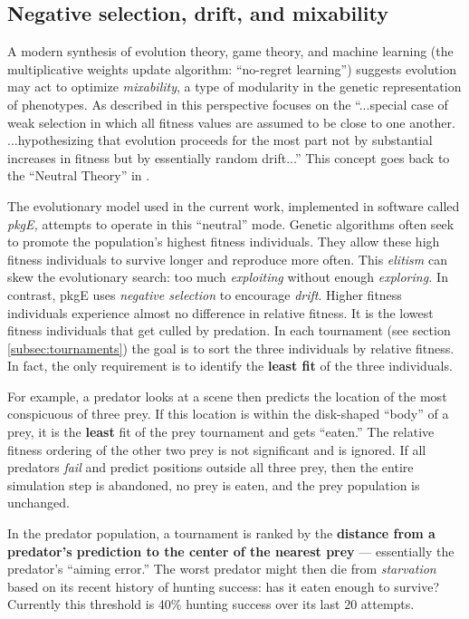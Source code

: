 \documentclass[acmtog]{acmart}
\newcommand{\jargon}[1]{\textit{#1}}
\newcommand{\lazypredator}[0]{pkgE}
\begin{document}
\subsection{Negative selection, drift, and mixability}

A modern synthesis \cite{livnat_sex_2016} of evolution theory, game theory, and machine learning (the multiplicative weights update algorithm: “no-regret learning”) suggests evolution may act to optimize \jargon{mixability}, a type of modularity in the genetic representation of phenotypes. As described in \citet{chastain_multiplicative_2013} this perspective focuses on the “...special case of weak selection in which all fitness values are assumed to be close to one another. ...hypothesizing that evolution proceeds for the most part not by substantial increases in fitness but by essentially random drift...” This concept goes back to the “Neutral Theory” in \citet{kimura_evolutionary_1968}.
\par
The evolutionary model used in the current work, implemented in software called \jargon{\lazypredator{},} attempts to operate in this “neutral” mode. Genetic algorithms often seek to promote the population's highest fitness individuals. They allow these high fitness individuals to survive longer and reproduce more often. This \jargon{elitism} can skew the evolutionary search: too much \jargon{exploiting} without enough \jargon{exploring.}  In contrast, \lazypredator{} uses \textit{negative selection} to encourage \jargon{drift}. Higher fitness individuals experience almost no difference in  relative fitness. It is the lowest fitness individuals that get culled by predation. In each tournament (see section \ref{subsec:tournaments}) the goal is to sort the three individuals by relative fitness. In fact, the only requirement is to identify the \textbf{least fit} of the three individuals.
\par 
For example, a predator looks at a scene then predicts the location of the most conspicuous of three prey. If this location is within the disk-shaped “body” of a prey, it is the \textbf{least} fit of the prey tournament and gets “eaten.” The relative fitness ordering of the other two prey is not significant and is ignored. If all predators \jargon{fail} and predict positions outside all three prey, then the entire simulation step is abandoned, no prey is eaten, and the prey population is unchanged.
\par
In the predator population, a tournament is ranked by the \textbf{distance from a predator's prediction to the center of the nearest prey} — essentially the predator's “aiming error.” The worst predator might then die from \jargon{starvation} based on its recent history of hunting success: has it eaten enough to survive? Currently this threshold is 40\% hunting success over its last 20 attempts.
\end{document}
